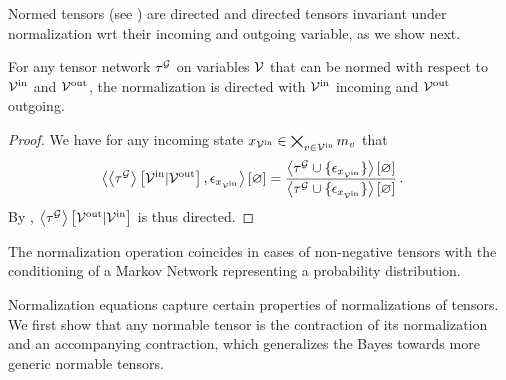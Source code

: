 Normed tensors (see ) are directed and directed tensors invariant under normalization wrt their incoming and outgoing variable, as we show next.

\begin{theorem}
    \label{the:normalizationDirected}
    For any tensor network $\tau^{\mathcal{G}}$ on variables $\mathcal{V}$ that can be normed with respect to $\mathcal{V}^{\mathrm{in}}$ and $\mathcal{V}^{\mathrm{out}}$, the normalization is directed with $\mathcal{V}^{\mathrm{in}}$ incoming and $\mathcal{V}^{\mathrm{out}}$ outgoing.
\end{theorem}
\begin{proof}
    We have for any incoming state ${x_{\mathcal{V}^{\mathrm{in}}}\in\bigtimes_{v\in\mathcal{V}^{\mathrm{in}}}m_{v}}$ that
    \begin{align*}
        \left\langle \left\langle \tau^{\mathcal{G}}\right\rangle \left[ \mathcal{V}^{\mathrm{in}} | \mathcal{V}^{\mathrm{out}} \right], \epsilon_{x_{\mathcal{V}^{\mathrm{in}}}}\right\rangle \left[ \varnothing \right]
        & =  \frac{
            \left\langle \tau^{\mathcal{G}}\cup\{\epsilon_{x_{\mathcal{V}^{\mathrm{in}}}}\}\right\rangle \left[ \varnothing \right]
        }{
            \left\langle \tau^{\mathcal{G}}\cup\{\epsilon_{x_{\mathcal{V}^{\mathrm{in}}}}\}\right\rangle \left[ \varnothing \right]
        } \, .
    \end{align*}
    By , $\left\langle \tau^{\mathcal{G}}\right\rangle \left[ \mathcal{V}^{\mathrm{out}} | \mathcal{V}^{\mathrm{in}} \right]$ is thus directed.
\end{proof}

The normalization operation coincides in cases of non-negative tensors with the conditioning of a Markov Network representing a probability distribution.


Normalization equations capture certain properties of normalizations of tensors.
We first show that any normable tensor is the contraction of its normalization and an accompanying contraction, which generalizes the Bayes  towards more generic normable tensors.

